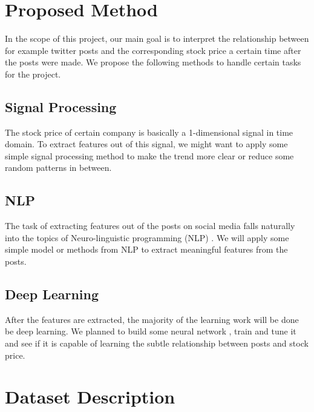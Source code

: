 \documentclass[10pt,twocolumn,letterpaper]{article}
\begin{document}
\section{Proposed Method}

In the scope of this project, our main goal is to interpret the relationship between for example twitter posts and the corresponding stock price a certain time after the posts were made. We propose the following methods to handle certain tasks for the project.

\subsection{Signal Processing}

The stock price \cite{StockPrice1} of certain company is basically a 1-dimensional signal in time domain. To extract features out of this signal, we might want to apply some simple signal processing method to make the trend more clear or reduce some random patterns in between.

\subsection{NLP}

The task of extracting features out of the posts on social media falls naturally into the topics of Neuro-linguistic programming (NLP) \cite{NLP}.
We will apply some simple model or methods from NLP to extract meaningful features from the posts.

\subsection{Deep Learning}

After the features are extracted, the majority of the learning work will be done be deep learning. We planned to build some neural network \cite{NN}, train and tune it and see if it is capable of learning the subtle relationship between posts and stock price.

\section{Dataset Description}
\end{document}
